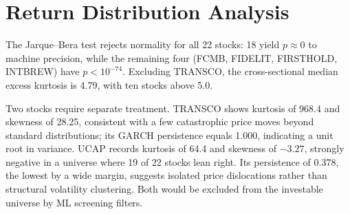 \documentclass[twoside,11pt]{article}
\begin{document}
	
	\section{Return Distribution Analysis}
	\label{sec:dist}
	
	The Jarque--Bera test rejects normality for all 22 stocks: 18 yield $p \approx 0$ to machine precision, while the remaining four (FCMB, FIDELIT, FIRSTHOLD, INTBREW) have $p < 10^{-74}$. Excluding TRANSCO, the cross-sectional median excess kurtosis is 4.79, with ten stocks above 5.0.
	
	Two stocks require separate treatment. TRANSCO shows kurtosis of 968.4 and skewness of 28.25, consistent with a few catastrophic price moves beyond standard distributions; its GARCH persistence equals 1.000, indicating a unit root in variance. UCAP records kurtosis of 64.4 and skewness of $-3.27$, strongly negative in a universe where 19 of 22 stocks lean right. Its persistence of 0.378, the lowest by a wide margin, suggests isolated price dislocations rather than structural volatility clustering. Both would be excluded from the investable universe by ML screening filters.
	
\end{document}

